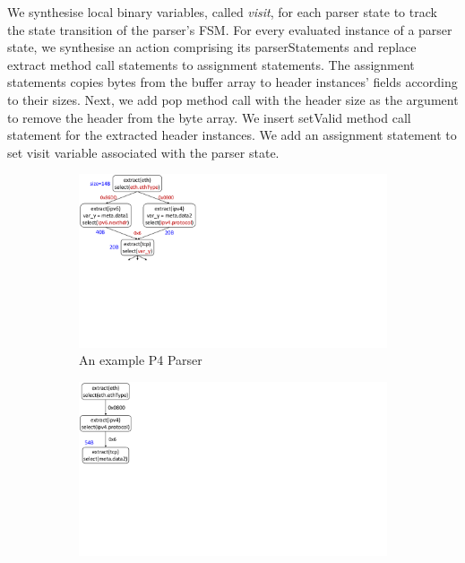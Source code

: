 \documentclass{hotnets19}
\begin{document}
We synthesise local binary variables, called \emph{visit},  for each parser state to track the state transition of the parser's FSM.
For every evaluated instance of a parser state, we synthesise an action comprising its parser\-Statements and replace extract method call statements to assignment statements.
The assignment statements copies bytes from the buffer array to header instances' fields according to their sizes.
Next, we add pop method call with the header size as the argument to remove the header from the byte array.
We insert setValid method call statement for the extracted header instances.
We add an assignment statement to set visit variable associated with the parser state.

\begin{figure}[!h]
    \begin{subfigure}[b]{0.3\linewidth}
        \centering
        \includegraphics[trim=4 270 596 0, clip,scale=0.4]{parser-transformation-example}
        \caption{An example P4 Parser}
        \label{subfig:parser}
    \end{subfigure}
    \begin{subfigure}[b]{0.3\linewidth}
        \centering
        \includegraphics[trim=4 285 796 0, clip,scale=0.4]{parser-example-se-1}

\end{subfigure}
\end{figure}
\end{document}
